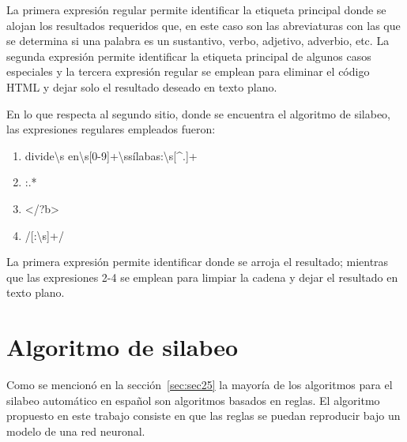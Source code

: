 La primera expresión regular permite identificar la etiqueta principal donde se alojan los resultados requeridos que, en este caso son las abreviaturas con las que se determina si una palabra es un sustantivo, verbo, adjetivo, adverbio, etc. La segunda expresión permite identificar la etiqueta principal de algunos casos especiales y la tercera expresión regular se emplean para eliminar el código HTML y dejar solo el resultado deseado en texto plano.

En lo que respecta al segundo sitio, donde se encuentra el algoritmo de silabeo, las expresiones regulares empleados fueron:

\begin{enumerate}
	\item divide\textbackslash s en\textbackslash s[0-9]+\textbackslash ssílabas:\textbackslash s[\textasciicircum.]+
	
	\item :.*
	
	\item \textless/?b\textgreater
	
	\item /[:\textbackslash s]+/
\end{enumerate}

La primera expresión permite identificar donde se arroja el resultado; mientras que las expresiones 2-4 se emplean para limpiar la cadena y dejar el resultado en texto plano.

\section{Algoritmo de silabeo}

Como se mencionó en la sección~\ref{sec:sec25} la mayoría de los algoritmos para el silabeo automático en español son algoritmos basados en reglas. El algoritmo propuesto en este trabajo consiste en que las reglas se puedan reproducir bajo un modelo de una red neuronal.

